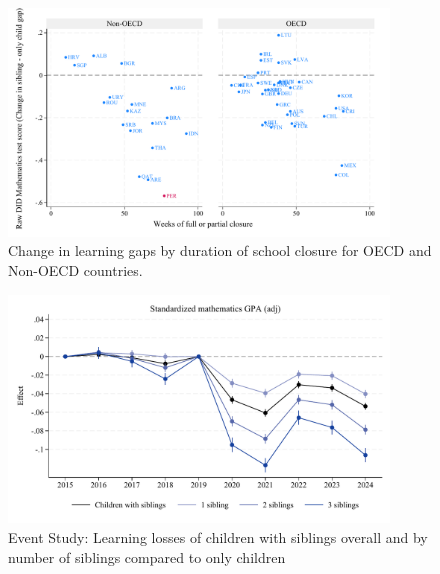 \documentclass[AER]{AEA}
\begin{document}
\newpage


\begin{figure}[htbp]
    \centering
    
        \centering
        \includegraphics[width=0.9\textwidth]{./FIGURES/Descriptive/PISA_raw_DID_PV1MATH_not_fully_open.pdf}
    
    \caption{Change in learning gaps by duration of school closure for OECD and Non-OECD countries.}
    \label{fig:pisa}
\end{figure}

\begin{figure}[htbp]
    \centering
    
        \centering
        \includegraphics[width=0.9\textwidth]{./FIGURES/Event Study/covid_std_gpa_m_adj_all_all_all_elm_all.pdf}
    
    \caption{Event Study: Learning losses of children with siblings overall and by number of siblings compared to only children}
    \label{fig:event_study}
\end{figure}
\end{document}
